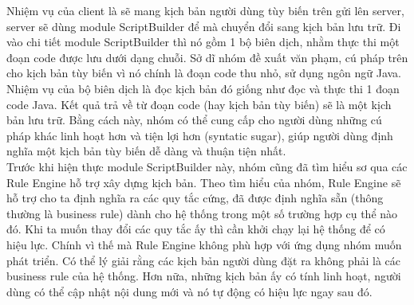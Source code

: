\documentclass[12pt,a4paper,oneside]{extbook}
\begin{document}
%	
%	
%	
%	
%	
%	
%	
%	
%
%
\noindent
Nhiệm vụ của client là sẽ mang kịch bản người dùng tùy biến trên gửi lên server, server sẽ dùng module ScriptBuilder để mà chuyển đổi sang kịch bản lưu trữ. Đi vào chi tiết module ScriptBuilder thì nó gồm 1 bộ biên dịch, nhằm thực thi một đoạn code được lưu dưới dạng chuỗi. Sở dĩ nhóm đề xuất văn phạm, cú pháp trên cho kịch bản tùy biến vì nó chính là đoạn code thu nhỏ, sử dụng ngôn ngữ Java. Nhiệm vụ của bộ biên dịch là đọc kịch bản đó giống như đọc và thực thi 1 đoạn code Java. Kết quả trả về từ đoạn code (hay kịch bản tùy biến) sẽ là một kịch bản lưu trữ. Bằng cách này, nhóm có thể cung cấp cho người dùng những cú pháp khác linh hoạt hơn và tiện lợi hơn (syntatic sugar), giúp người dùng định nghĩa một kịch bản tùy biến dễ dàng và thuận tiện nhất.\\

\noindent
Trước khi hiện thực module ScriptBuilder này, nhóm cũng đã tìm hiểu sơ qua các Rule Engine hỗ trợ xây dựng kịch bản. Theo tìm hiểu của nhóm, Rule Engine sẽ hỗ trợ cho ta định nghĩa ra các quy tắc cứng, đã được định nghĩa sẵn (thông thường là business rule) dành cho hệ thống trong một số trường hợp cụ thể nào đó. Khi ta muốn thay đổi các quy tắc ấy thì cần khởi chạy lại hệ thống để có hiệu lực. Chính vì thế mà Rule Engine không phù hợp với ứng dụng nhóm muốn phát triển. Có thể lý giải rằng các kịch bản người dùng đặt ra không phải là các business rule của hệ thống. Hơn nữa, những kịch bản ấy có tính linh hoạt, người dùng có thể cập nhật nội dung mới và nó tự động có hiệu lực ngay sau đó.
\end{document}

